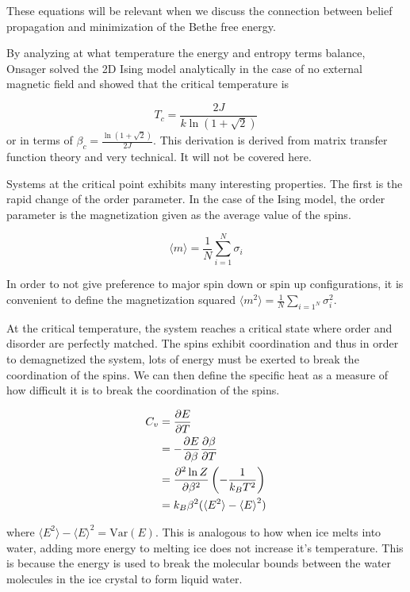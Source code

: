 \documentclass{article}
\begin{document}
These equations will be relevant when we discuss the connection between belief propagation and minimization of the Bethe free energy.

By analyzing at what temperature the energy and entropy terms balance, Onsager solved the 2D Ising model analytically in the case of no external magnetic field and showed that the critical temperature is

\begin{equation} \label{eq:eq24}
    T_c = \frac{2J}{k \ln(1 + \sqrt2)}
\end{equation}
or in terms of $\beta_c = \frac{\ln(1 + \sqrt2)}{2J}$. This derivation is derived from matrix transfer function theory \cite{Onsager1944} and very technical. It will not be covered here.


Systems at the critical point exhibits many interesting properties. The first is the rapid change of the order parameter.
In the case of the Ising model, the order parameter is the magnetization given as the average value of the spins.

\begin{equation}
    \langle m \rangle = \frac1N \sum_{i=1}^N \sigma_i
\end{equation}

In order to not give preference to major spin down or spin up configurations, it is convenient to define the magnetization squared
$\langle m^2 \rangle = \frac1N \sum_{i=1^N} \sigma_i^2$.

At the critical temperature, the system reaches a critical state where order and disorder are perfectly matched.
The spins exhibit coordination and thus in order to demagnetized the system, lots of energy must be exerted to break the coordination of the spins.
We can then define the specific heat as a measure of how difficult it is to break the coordination of the spins.

\begin{align}
    C_v &= \pdv{E}{T} \\
    &= -\pdv{E}{\beta} \pdv{\beta}{T} \\
    &= \pdv[2]{\ln Z}{\beta} \left( - \frac{1}{k_B T^2} \right) \\
    &= k_B \beta^2 ( \langle E^2 \rangle - { \langle E \rangle }^2 )
\end{align}

where $\langle E^2 \rangle - { \langle E \rangle }^2 = \mathrm{Var}(E)$. This is analogous to how when ice melts into water, 
adding more energy to melting ice does not increase it's temperature. This is because the energy is used to break the molecular bounds between 
the water molecules in the ice crystal to form liquid water. 
\end{document}
